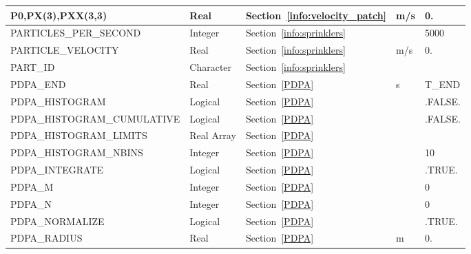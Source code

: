 \documentclass[11pt]{book}
\begin{document}
\begin{longtable}{@{\extracolsep{\fill}}|l|l|l|l|l|}
{\ct P0,PX(3),PXX(3,3)}                 & Real          & Section~\ref{info:velocity_patch}         & m/s                   &  0.         \\ \hline
{\ct PARTICLES\_PER\_SECOND}            & Integer       & Section~\ref{info:sprinklers}             &                       & 5000      \\ \hline
{\ct PARTICLE\_VELOCITY}                & Real          & Section~\ref{info:sprinklers}             & m/s                   & 0.       \\ \hline
{\ct PART\_ID}                          & Character     & Section~\ref{info:sprinklers}             &                       &           \\ \hline
{\ct PDPA\_END}                         & Real          & Section~\ref{PDPA}                        & s                     & {\ct T\_END} \\ \hline
{\ct PDPA\_HISTOGRAM}                   & Logical       & Section~\ref{PDPA}                        &                       & .FALSE.   \\ \hline
{\ct PDPA\_HISTOGRAM\_CUMULATIVE}       & Logical       & Section~\ref{PDPA}                        &                       & .FALSE.   \\ \hline
{\ct PDPA\_HISTOGRAM\_LIMITS}           & Real Array    & Section~\ref{PDPA}                        &                       &       \\ \hline
{\ct PDPA\_HISTOGRAM\_NBINS}            & Integer       & Section~\ref{PDPA}                        &                       & 10        \\ \hline
{\ct PDPA\_INTEGRATE}                   & Logical       & Section~\ref{PDPA}                        &                       & {\ct .TRUE.}         \\ \hline
{\ct PDPA\_M}                           & Integer       & Section~\ref{PDPA}                        &                       & 0         \\ \hline
{\ct PDPA\_N}                           & Integer       & Section~\ref{PDPA}                        &                       & 0         \\ \hline
{\ct PDPA\_NORMALIZE}                   & Logical       & Section~\ref{PDPA}                        &                       & {\ct .TRUE.}         \\ \hline
{\ct PDPA\_RADIUS}                      & Real          & Section~\ref{PDPA}                        & m                     & 0.        \\ \hline

\end{longtable}
\end{document}
